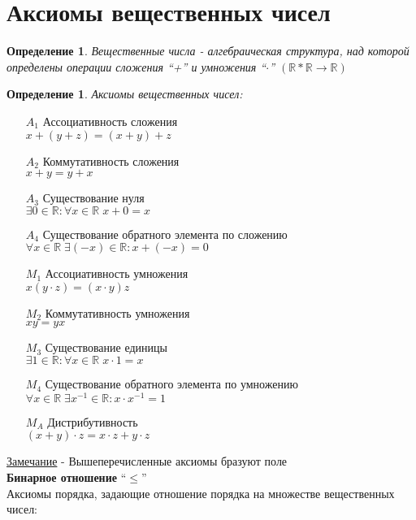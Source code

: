 \documentclass[12pt,letterpaper]{report}
\newtheorem{conj}[theorem]{Определение}
\begin{document}
\section{Аксиомы вещественных чисел}
\begin{conj}
    Вещественные числа - алгебраическая структура, над которой определены 
    операции сложения ``+'' и умножения ``$\cdot$'' $(\mathbb{R} * \mathbb{R} \rightarrow \mathbb{R})$
\end{conj}
\newpage
\begin{conj}
    Аксиомы вещественных чисел:
\end{conj}
\begin{itemize}
    \item[$A_1$] Ассоциативность сложения \\
     $x + (y + z) = (x + y) + z$
    \item[$A_2$] Коммутативность сложения \\
     $x + y = y + x$
    \item[$A_3$] Существование нуля \\
     $\exists 0 \in \mathbb{R} : \forall x \in \mathbb{R} \; x + 0 = x$
    \item[$A_4$] Существование обратного элемента по сложению \\
     $\forall x \in \mathbb{R} \; \exists (-x) \in \mathbb{R} : x + (-x) = 0$
    \item[$M_1$] Ассоциативность умножения \\
     $x(y \cdot z) = (x \cdot y)z$
    \item[$M_2$] Коммутативность умножения \\
     $xy = yx$
    \item[$M_3$] Существование единицы \\
     $\exists 1 \in \mathbb{R} : \forall x \in \mathbb{R} \; x \cdot 1 = x$
    \item[$M_4$] Существование обратного элемента по умножению \\
     $\forall x \in \mathbb{R} \; \exists x^{-1} \in \mathbb{R} : x \cdot x^{-1} = 1$
    \item[$M_A$] Дистрибутивность \\
     $(x + y) \cdot z = x \cdot z + y \cdot z$ 
\end{itemize}
\underline{Замечание} - Вышеперечисленные аксиомы бразуют поле \vspace{0.5cm} \\
\textbf{Бинарное отношение} ``$\leqslant$'' \\
Аксиомы порядка, задающие отношение порядка на множестве вещественных чисел:
\end{document}

